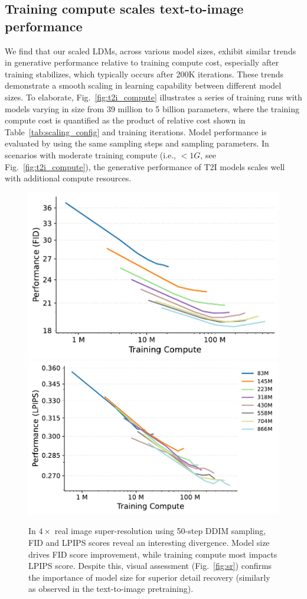\subsection{Training compute scales text-to-image performance}
\label{sec:scalingt2i}

We find that our scaled LDMs, across various model sizes, exhibit similar trends in generative performance relative to training compute cost, especially after training stabilizes, which typically occurs after 200K iterations.
These trends demonstrate a smooth scaling in learning capability between different model sizes.
To elaborate, Fig.~\ref{fig:t2i_compute} illustrates a series of training runs with models varying in size from 39 million to 5 billion parameters, where the training compute cost is quantified as the product of relative cost shown in Table~\ref{tab:scaling_config} and training iterations.
Model performance is evaluated by using the same sampling steps and sampling parameters.
In scenarios with moderate training compute (i.e., $<1G$, see Fig.~\ref{fig:t2i_compute}), the generative performance of T2I models scales well with additional compute resources. 


\begin{figure}[t]
\centering
\includegraphics[height=.315\linewidth]{cp2/figures/sr_fid_compute.pdf}
\includegraphics[height=.315\linewidth]{cp2/figures/sr_lpips_compute.pdf}
\caption{In $4\times$ real image super-resolution using 50-step DDIM sampling, FID and LPIPS scores reveal an interesting divergence. Model size drives FID score improvement, while training compute most impacts LPIPS score. Despite this, visual assessment (Fig.~\ref{fig:sr}) confirms the importance of model size for superior detail recovery (similarly as observed in the text-to-image pretraining).
}
\label{fig:sr_compute}
\end{figure}

